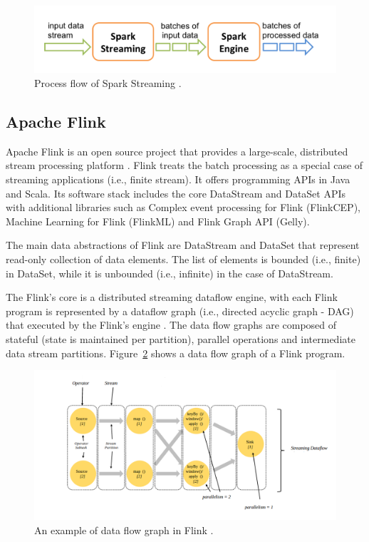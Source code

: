 \documentclass[]{article}
\begin{document}
\begin{figure}[h]

  \centering
    \includegraphics[width=.9\textwidth, height=.3\textheight]{streaming-flow.png}
     \caption{ Process flow of Spark Streaming \cite{spark_streaming}.}
      \label{fig:spark}
\end{figure} 

\subsection{Apache Flink}

\par Apache Flink is an open source project that provides a large-scale, distributed stream processing platform \cite{flink}. Flink treats the batch processing as a special case of streaming applications (i.e., finite stream).
It offers programming APIs in Java and Scala. Its software stack includes the core DataStream and DataSet APIs with additional libraries such as Complex event processing for Flink (FlinkCEP), Machine Learning for Flink (FlinkML)  and Flink Graph API (Gelly).

\par The main data abstractions of Flink are DataStream and DataSet that represent read-only collection of data elements. The list of elements is bounded (i.e., finite) in DataSet, while it is unbounded (i.e., infinite) in the case of DataStream.

\par The Flink's core is a distributed streaming dataflow engine,  with each Flink program is represented by a dataflow graph (i.e., directed acyclic graph - DAG) that executed by the Flink's engine \cite{flink_paper}. The data flow graphs are composed of stateful (state is maintained per partition), parallel operations and intermediate data stream partitions. Figure~\ref{fig:fstream} shows a data flow graph of a Flink program.


\begin{figure}[h]

  \centering
    \includegraphics[width=\textwidth, height=.5\textheight]{flink_engine.png}
     \caption{ An example of data flow graph in Flink \cite{flink}.}
      \label{fig:fstream}
\end{figure} 
\newpage
\end{document}
